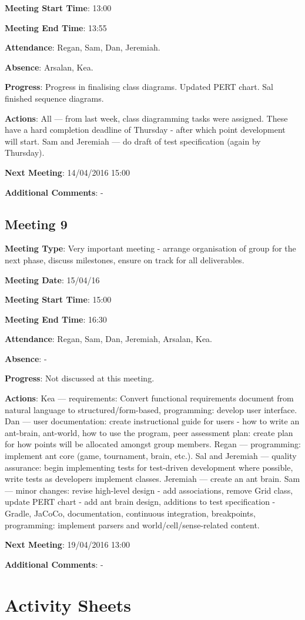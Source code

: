 \documentclass[11pt]{article}
\begin{document}
\textbf{Meeting Start Time}: 13:00

\textbf{Meeting End Time}: 13:55

\textbf{Attendance}: Regan, Sam, Dan, Jeremiah.

\textbf{Absence}: Arsalan, Kea.

\textbf{Progress}: Progress in finalising class diagrams. Updated PERT chart. Sal finished sequence diagrams.

\textbf{Actions}: All --- from last week, class diagramming tasks were assigned. These have a hard completion deadline of Thursday - after which point development will start. Sam and Jeremiah --- do draft of test specification (again by Thursday).

\textbf{Next Meeting}: 14/04/2016 15:00

\textbf{Additional Comments}: -

\subsection{Meeting 9}

\textbf{Meeting Type}: Very important meeting - arrange organisation of group for the next phase, discuss milestones, ensure on track for all deliverables.

\textbf{Meeting Date}: 15/04/16

\textbf{Meeting Start Time}: 15:00

\textbf{Meeting End Time}: 16:30

\textbf{Attendance}: Regan, Sam, Dan, Jeremiah, Arsalan, Kea.

\textbf{Absence}: -

\textbf{Progress}: Not discussed at this meeting.

\textbf{Actions}: Kea --- requirements: Convert functional requirements document from natural language to structured/form-based, programming: develop user interface. Dan --- user documentation: create instructional guide for users - how to write an ant-brain, ant-world, how to use the program, peer assessment plan: create plan for how points will be allocated amongst group members. Regan --- programming: implement ant core (game, tournament, brain, etc.). Sal and Jeremiah --- quality assurance: begin implementing tests for test-driven development where possible, write tests as developers implement classes. Jeremiah --- create an ant brain. Sam --- minor changes: revise high-level design - add associations, remove Grid class, update PERT chart - add ant brain design, additions to test specification - Gradle, JaCoCo, documentation, continuous integration, breakpoints, programming: implement parsers and world/cell/sense-related content.

\textbf{Next Meeting}: 19/04/2016 13:00

\textbf{Additional Comments}: -

\section{Activity Sheets}
\end{document}

